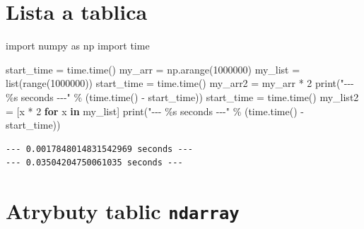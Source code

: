 \documentclass[
  polish,
  letterpaper,
  DIV=11,
  numbers=noendperiod]{scrreprt}
\newenvironment{Shaded}{\begin{snugshade}}{\end{snugshade}}
\newcommand{\BuiltInTok}[1]{\textcolor[rgb]{0.00,0.23,0.31}{#1}}
\newcommand{\ControlFlowTok}[1]{\textcolor[rgb]{0.00,0.23,0.31}{\textbf{#1}}}
\newcommand{\DecValTok}[1]{\textcolor[rgb]{0.68,0.00,0.00}{#1}}
\newcommand{\ImportTok}[1]{\textcolor[rgb]{0.00,0.46,0.62}{#1}}
\newcommand{\KeywordTok}[1]{\textcolor[rgb]{0.00,0.23,0.31}{\textbf{#1}}}
\newcommand{\NormalTok}[1]{\textcolor[rgb]{0.00,0.23,0.31}{#1}}
\newcommand{\OperatorTok}[1]{\textcolor[rgb]{0.37,0.37,0.37}{#1}}
\newcommand{\SpecialCharTok}[1]{\textcolor[rgb]{0.37,0.37,0.37}{#1}}
\newcommand{\StringTok}[1]{\textcolor[rgb]{0.13,0.47,0.30}{#1}}
\begin{document}
\chapter{Lista a tablica}\label{lista-a-tablica}

\begin{Shaded}
\begin{Highlighting}[]
\ImportTok{import}\NormalTok{ numpy }\ImportTok{as}\NormalTok{ np}
\ImportTok{import}\NormalTok{ time}

\NormalTok{start\_time }\OperatorTok{=}\NormalTok{ time.time()}
\NormalTok{my\_arr }\OperatorTok{=}\NormalTok{ np.arange(}\DecValTok{1000000}\NormalTok{)}
\NormalTok{my\_list }\OperatorTok{=} \BuiltInTok{list}\NormalTok{(}\BuiltInTok{range}\NormalTok{(}\DecValTok{1000000}\NormalTok{))}
\NormalTok{start\_time }\OperatorTok{=}\NormalTok{ time.time()}
\NormalTok{my\_arr2 }\OperatorTok{=}\NormalTok{ my\_arr }\OperatorTok{*} \DecValTok{2}
\BuiltInTok{print}\NormalTok{(}\StringTok{"{-}{-}{-} }\SpecialCharTok{\%s}\StringTok{ seconds {-}{-}{-}"} \OperatorTok{\%}\NormalTok{ (time.time() }\OperatorTok{{-}}\NormalTok{ start\_time))}
\NormalTok{start\_time }\OperatorTok{=}\NormalTok{ time.time()}
\NormalTok{my\_list2 }\OperatorTok{=}\NormalTok{ [x }\OperatorTok{*} \DecValTok{2} \ControlFlowTok{for}\NormalTok{ x }\KeywordTok{in}\NormalTok{ my\_list]}
\BuiltInTok{print}\NormalTok{(}\StringTok{"{-}{-}{-} }\SpecialCharTok{\%s}\StringTok{ seconds {-}{-}{-}"} \OperatorTok{\%}\NormalTok{ (time.time() }\OperatorTok{{-}}\NormalTok{ start\_time))}
\end{Highlighting}
\end{Shaded}

\begin{verbatim}
--- 0.0017848014831542969 seconds ---
--- 0.03504204750061035 seconds ---
\end{verbatim}

\chapter{\texorpdfstring{Atrybuty tablic
\texttt{ndarray}}{Atrybuty tablic ndarray}}\label{atrybuty-tablic-ndarray}
\end{document}
